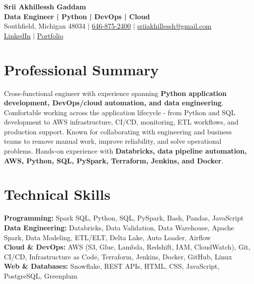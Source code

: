 \documentclass[letterpaper,10pt]{article}
\begin{document}
\fontsize{9.35pt}{10.45pt}\selectfont

\begin{center}
    {\LARGE \textbf{Srii Akhillessh Gaddam}} \\[-1pt]
    \textbf{Data Engineer | Python | DevOps | Cloud} \\[2pt]
    Southfield, Michigan 48034 $|$
    \href{tel:6468752400}{646-875-2400} $|$
    \href{mailto:sriiakhillessh@gmail.com}{sriiakhillessh@gmail.com} \\[1pt]
    \href{https://www.linkedin.com/in/srii-akhiilessh-gaddam-b48668191/}{LinkedIn} $|$
    \href{https://sriiakhillesshg.github.io/portfolio/}{Portfolio}
\end{center}
\vspace{-8pt}

\section{Professional Summary}
\small{Cross-functional engineer with experience spanning \textbf{Python application development, DevOps/cloud automation, and data engineering}. Comfortable working across the application lifecycle - from Python and SQL development to AWS infrastructure, CI/CD, monitoring, ETL workflows, and production support. Known for collaborating with engineering and business teams to remove manual work, improve reliability, and solve operational problems. Hands-on experience with \textbf{Databricks, data pipeline automation, AWS, Python, SQL, PySpark, Terraform, Jenkins, and Docker}.}

\section{Technical Skills}
\small{
\textbf{Programming:} Spark SQL, Python, SQL, PySpark, Bash, Pandas, JavaScript \\
\textbf{Data Engineering:} Databricks, Data Validation, Data Warehouse, Apache Spark, Data Modeling, ETL/ELT, Delta Lake, Auto Loader, Airflow \\
\textbf{Cloud \& DevOps:} AWS (S3, Glue, Lambda, Redshift, IAM, CloudWatch), Git, CI/CD, Infrastructure as Code, Terraform, Jenkins, Docker, GitHub, Linux \\
\textbf{Web \& Databases:} Snowflake, REST APIs, HTML, CSS, JavaScript, PostgreSQL, Greenplum
}
\end{document}
